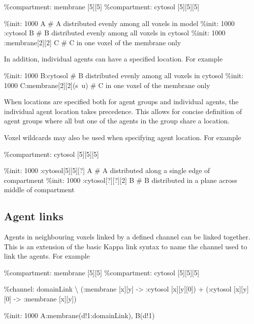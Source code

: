 \begin{kappasource}
\%compartment: membrane [5][5]
\%compartment: cytosol [5][5][5]

\%init: 1000 A                   # A distributed evenly among all voxels in model 
\%init: 1000 :cytosol B          # B distributed evenly among all voxels in cytosol
\%init: 1000 :membrane[2][2] C   # C in one voxel of the membrane only 
\end{kappasource}

In addition, individual agents can have a specified location. For example
\begin{kappasource}
\%init: 1000 B:cytosol             # B distributed evenly among all voxels in cytosol
\%init: 1000 C:membrane[2][2](s~u) # C in one voxel of the membrane only 
\end{kappasource}

When locations are specified both for agent groups and individual agents, the individual agent location takes precedence. This allows for concise definition of agent groups where all but one of the agents in the group share a location.

Voxel wildcards may also be used when specifying agent location. For example

\begin{kappasource}
\%compartment: cytosol [5][5][5]

\%init: 1000 :cytosol[5][5][?] A # A distributed along a single edge of compartment
\%init: 1000 :cytosol[?][?][2] B # B distributed in a plane across middle of compartment
\end{kappasource}


\subsection{Agent links}

Agents in neighbouring voxels linked by a defined channel can be linked together. This is an extension of the basic Kappa link syntax to name the channel used to link the agents. For example

\begin{kappasource}
\%compartment: membrane [5][5]
\%compartment: cytosol [5][5][5]

\%channel: domainLink {\textbackslash}
    (:membrane [x][y] -> :cytosol [x][y][0]) + (:cytosol [x][y][0] -> :membrane [x][y])

\%init: 1000 A:membrane(d!1:domainLink), B(d!1)
\end{kappasource}

